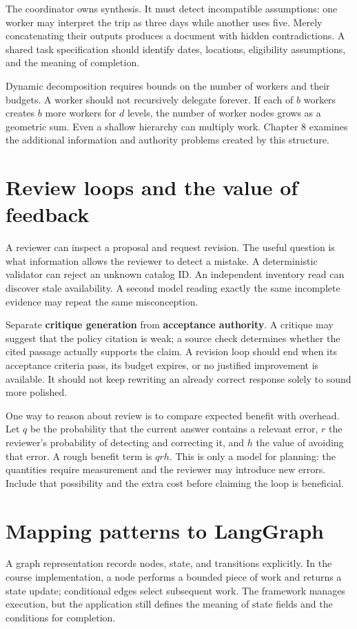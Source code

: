 The coordinator owns synthesis. It must detect incompatible assumptions: one worker may interpret the trip as three days while another uses five. Merely concatenating their outputs produces a document with hidden contradictions. A shared task specification should identify dates, locations, eligibility assumptions, and the meaning of completion.

Dynamic decomposition requires bounds on the number of workers and their budgets. A worker should not recursively delegate forever. If each of \(b\) workers creates \(b\) more workers for \(d\) levels, the number of worker nodes grows as a geometric sum. Even a shallow hierarchy can multiply work. Chapter 8 examines the additional information and authority problems created by this structure.

\section{Review loops and the value of feedback}
A reviewer can inspect a proposal and request revision. The useful question is what information allows the reviewer to detect a mistake. A deterministic validator can reject an unknown catalog ID. An independent inventory read can discover stale availability. A second model reading exactly the same incomplete evidence may repeat the same misconception.

Separate \textbf{critique generation} from \textbf{acceptance authority}. A critique may suggest that the policy citation is weak; a source check determines whether the cited passage actually supports the claim. A revision loop should end when its acceptance criteria pass, its budget expires, or no justified improvement is available. It should not keep rewriting an already correct response solely to sound more polished.

One way to reason about review is to compare expected benefit with overhead. Let \(q\) be the probability that the current answer contains a relevant error, \(r\) the reviewer's probability of detecting and correcting it, and \(h\) the value of avoiding that error. A rough benefit term is \(qrh\). This is only a model for planning: the quantities require measurement and the reviewer may introduce new errors. Include that possibility and the extra cost before claiming the loop is beneficial.

\section{Mapping patterns to LangGraph}
A graph representation records nodes, state, and transitions explicitly. In the course implementation, a node performs a bounded piece of work and returns a state update; conditional edges select subsequent work. The framework manages execution, but the application still defines the meaning of state fields and the conditions for completion.

